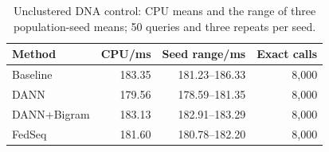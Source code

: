 \begin{table}[t]
\centering
\caption{Unclustered DNA control: CPU means and the range of three population-seed means; 50 queries and three repeats per seed.}
\label{tab:unstructured}
\small
\begin{tabular}{lrrr}
\toprule
Method & CPU/ms & Seed range/ms & Exact calls \\
\midrule
Baseline & 183.35 & 181.23--186.33 & 8,000 \\
DANN & 179.56 & 178.59--181.35 & 8,000 \\
DANN+Bigram & 183.13 & 182.91--183.29 & 8,000 \\
FedSeq & 181.60 & 180.78--182.20 & 8,000 \\
\bottomrule
\end{tabular}
\end{table}
